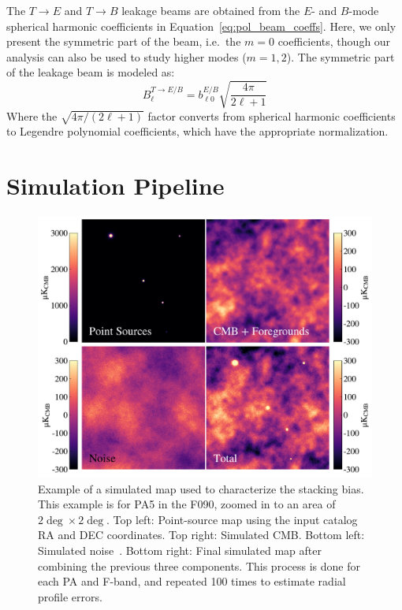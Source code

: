 The $T\rightarrow E$ and $T\rightarrow B$ leakage beams are obtained from the $E$- and $B$-mode spherical harmonic coefficients in Equation~\ref{eq:pol_beam_coeffs}.  Here, we only present the symmetric part of the beam, i.e.\ the $m=0$ coefficients, though our analysis can also be used to study higher modes ($m=1,2$).  
The symmetric part of the leakage beam is modeled as:
\begin{equation}
B^{T\rightarrow E/B}_{\ell} = b^{E/B}_{\ell 0} \sqrt{\frac{4 \pi}{2 \ell + 1}}
\end{equation}
Where the $\sqrt{4 \pi / (2 \ell + 1)}$ factor converts from spherical harmonic coefficients to Legendre polynomial coefficients, which have the appropriate normalization. 

\section{Simulation Pipeline}
\label{sec:sim_pipe}

\begin{figure}[t!]
    \centering
    \includegraphics[width=\linewidth]{Figures/simmap.pdf}
    \caption{Example of a simulated map used to characterize the stacking bias.  This example is for PA5 in the F090, zoomed in to an area of $2\deg\times2\deg$.  Top left: Point-source map using the input catalog RA and DEC coordinates.  Top right:  Simulated CMB.  Bottom left:  Simulated noise~\cite{atkins}.  Bottom right: Final simulated map after combining the previous three components.  This process is done for each PA and F-band, and repeated 100 times to estimate radial profile errors.
    }
    \label{fig:sim_map}
\end{figure}

